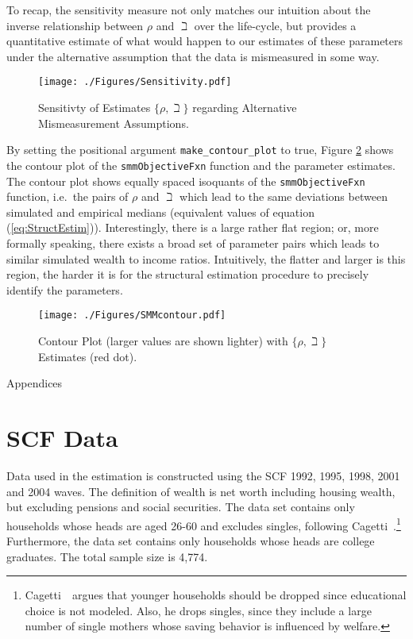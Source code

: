 \documentclass[titlepage, headings=optiontotocandhead]{Resources/texmf-local/tex/latex/econtex}
\begin{document}
To recap, the sensitivity measure not only matches our intuition about the inverse relationship between $\rho$ and $\beth$ over the life-cycle, but provides a quantitative estimate of what would happen to our estimates of these parameters under the alternative assumption that the data is mismeasured in some way.

\hypertarget{PlotSensitivityMeasure}{}
\begin{figure}
  \texttt{[image: ./Figures/Sensitivity.pdf]}
  \caption{Sensitivty of Estimates $\{\rho,\beth\}$ regarding Alternative Mismeasurement Assumptions.}
  \label{fig:PlotSensitivityMeasure}
\end{figure}

By setting the positional argument \texttt{make\_contour\_plot} to true, Figure \ref{fig:PlotContourMedianStrEst} shows the contour plot of the \texttt{smmObjectiveFxn} function and the parameter estimates. The contour plot shows equally spaced isoquants of the \texttt{smmObjectiveFxn} function, i.e.\ the pairs of $\rho$ and $\beth$ which lead to the same deviations between simulated and empirical medians (equivalent values of equation (\ref{eq:StructEstim})). Interestingly, there is a large rather flat region; or, more formally speaking, there exists a broad set of parameter pairs which leads to similar simulated wealth to income ratios. Intuitively, the flatter and larger is this region, the harder it is for the structural estimation procedure to precisely identify the parameters.


\hypertarget{PlotContourMedianStrEst}{}
\begin{figure}
  \texttt{[image: ./Figures/SMMcontour.pdf]}
  \caption{Contour Plot (larger values are shown lighter) with $\{\rho,\beth\}$ Estimates (red dot).}
  \label{fig:PlotContourMedianStrEst}
\end{figure}



\clearpage\vfill\eject

\centerline{\LARGE Appendices}\vspace{0.2in}

\appendix


\hypertarget{scf-data}{}
\section{SCF Data}\label{app:scf-data}

Data used in the estimation is constructed using the SCF 1992, 1995, 1998, 2001 and 2004 waves. The definition of wealth is net worth including housing wealth, but excluding pensions and social securities. The data set contains only households whose heads are aged 26-60 and excludes singles, following Cagetti~\citeyearpar{cagettiWprofiles}.\footnote{Cagetti~\citeyearpar{cagettiWprofiles}\ argues that younger households should be dropped since educational choice is not modeled. Also, he drops singles, since they include a large number of single mothers whose saving behavior is influenced by welfare.} Furthermore, the data set contains only households whose heads are college graduates. The total sample size is 4,774.
\end{document}
